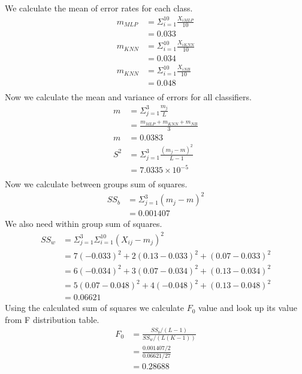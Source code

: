 \documentclass[12pt]{article}
\begin{document}
We calculate the mean of error rates for each class.
\begin{equation}
	\begin{aligned}
		m_{MLP} &= \Sigma_{i=1}^{10} \frac{X_{iMLP}}{10} \\
		&=0.033 \\
		m_{KNN} &= \Sigma_{i=1}^{10} \frac{X_{iKNN}}{10} \\
		&=0.034 \\	
		m_{KNN} &= \Sigma_{i=1}^{10} \frac{X_{iNB}}{10} \\
		&=0.048 \\		
	\end{aligned}
\end{equation}
Now we calculate the mean and variance of errors for all classifiers.
\begin{equation}
	\begin{aligned}
		m &= \Sigma_{j=1}^{3} \frac{m_j}{L} \\
		&=\frac{m_{MLP}+m_{KNN}+m_{NB}}{3}\\
		m &= 0.0383 \\
		S^2 &= \Sigma_{j=1}^{3} \frac{(m_j - m)^2}{L - 1} \\
		&=7.0335 \times 10^{-5} \\		
	\end{aligned}
\end{equation}
Now we calculate between groups sum of squares.
\begin{equation}
	\begin{aligned}
		SS_b &= \Sigma_{j=1}^{3} (m_j - m)^2 \\
		&=0.001407	
	\end{aligned}
\end{equation}
We also need within group sum of squares.
\begin{equation}
	\begin{aligned}
		SS_w &= \Sigma_{j=1}^{3}\Sigma_{i=1}^{10} (X_{ij} - m_j)^2 \\
		&=7(-0.033)^2 + 2(0.13-0.033)^2 +(0.07-0.033)^2 \\
		&=6(-0.034)^2 + 3(0.07-0.034)^2 +(0.13-0.034)^2	\\
		&=5(0.07-0.048)^2 + 4(-0.048)^2 +(0.13-0.048)^2	\\
		&=0.06621
	\end{aligned}
\end{equation}
Using the calculated sum of squares we calculate $F_0$ value and look up its value from F distribution table.
\begin{equation}
\begin{aligned}
	F_0 &= \frac{SS_b /(L-1)}{SS_w/(L(K-1))} \\
		&=\frac{0.001407/2}{0.06621/27} \\
		&=0.28688
	\end{aligned}
\end{equation}
\end{document}

